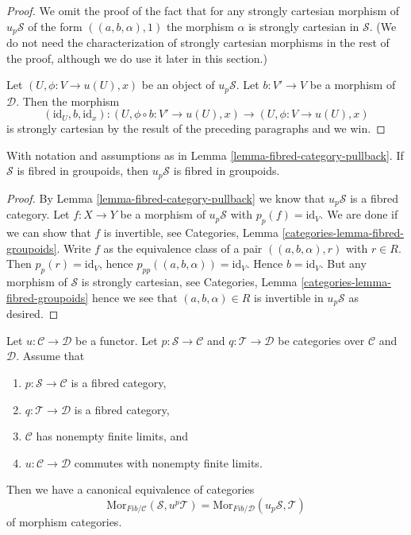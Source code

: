 \begin{proof}
\medskip\noindent
We omit the proof of the fact that for any strongly cartesian morphism
of $u_p\mathcal{S}$ of the form $((a, b, \alpha), 1)$ the morphism
$\alpha$ is strongly cartesian in $\mathcal{S}$.
(We do not need the characterization of strongly cartesian morphisms
in the rest of the proof, although we do use it later in this section.)

\medskip\noindent
Let $(U, \phi : V \to u(U), x)$ be an object of $u_p\mathcal{S}$.
Let $b : V' \to V$ be a morphism of $\mathcal{D}$. Then the morphism
$$
(\text{id}_U, b, \text{id}_x) :
(U, \phi \circ b : V' \to u(U), x)
\longrightarrow
(U, \phi : V \to u(U), x)
$$
is strongly cartesian by the result of the preceding paragraphs and we win.
\end{proof}

\begin{lemma}
\label{lemma-fibred-groupoids-category-pullback}
With notation and assumptions as in
Lemma \ref{lemma-fibred-category-pullback}.
If $\mathcal{S}$ is fibred in groupoids, then $u_p\mathcal{S}$ is fibred
in groupoids.
\end{lemma}

\begin{proof}
By
Lemma \ref{lemma-fibred-category-pullback}
we know that $u_p\mathcal{S}$ is a fibred category.
Let $f : X \to Y$ be a morphism of $u_p\mathcal{S}$ with
$p_p(f) = \text{id}_V$. We are done if we can show that $f$ is invertible, see
Categories, Lemma \ref{categories-lemma-fibred-groupoids}.
Write $f$ as the equivalence class of
a pair $((a, b, \alpha), r)$ with $r \in R$. Then $p_p(r) = \text{id}_V$,
hence $p_{pp}((a, b, \alpha)) = \text{id}_V$. Hence $b = \text{id}_V$.
But any morphism of $\mathcal{S}$ is strongly cartesian, see
Categories, Lemma \ref{categories-lemma-fibred-groupoids}
hence we see that $(a, b, \alpha) \in R$ is invertible
in $u_p\mathcal{S}$ as desired.
\end{proof}

\begin{lemma}
\label{lemma-adjointness-pullback-pushforward}
Let $u : \mathcal{C} \to \mathcal{D}$ be a functor.
Let $p : \mathcal{S} \to \mathcal{C}$ and $q : \mathcal{T} \to \mathcal{D}$
be categories over $\mathcal{C}$ and $\mathcal{D}$. Assume that
\begin{enumerate}
\item $p : \mathcal{S} \to \mathcal{C}$ is a fibred category,
\item $q : \mathcal{T} \to \mathcal{D}$ is a fibred category,
\item $\mathcal{C}$ has nonempty finite limits, and
\item $u : \mathcal{C} \to \mathcal{D}$ commutes with nonempty finite limits.
\end{enumerate}
Then we have a canonical equivalence of categories
$$
\text{Mor}_{\textit{Fib}/\mathcal{C}}(\mathcal{S}, u^p\mathcal{T})
=
\text{Mor}_{\textit{Fib}/\mathcal{D}}(u_p\mathcal{S}, \mathcal{T})
$$
of morphism categories.
\end{lemma}

